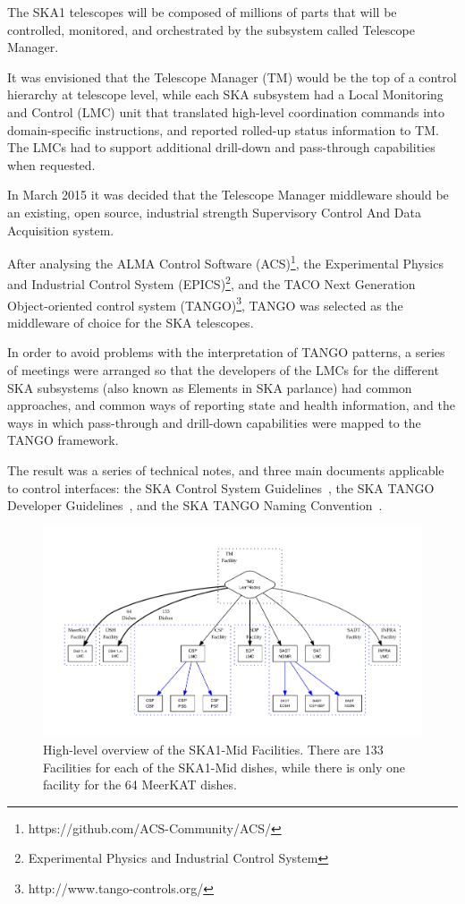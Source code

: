\documentclass[a4paper,
               biblatex,       %
               keeplastbox,    %
               ]{jacow-2_1}    %
\begin{document}
The SKA1 telescopes will be composed of millions of parts that will be controlled, monitored, and orchestrated by the subsystem called Telescope Manager. 

It was envisioned that the Telescope Manager (TM) would be the top of a control hierarchy at telescope level, while each SKA subsystem had a Local Monitoring and Control (LMC) unit that translated high-level coordination commands into domain-specific instructions, and reported rolled-up status information to TM. The LMCs had to support additional drill-down and pass-through capabilities when requested.

In March 2015 it was decided that the Telescope Manager middleware should be an existing, open source, industrial strength Supervisory Control And Data Acquisition system.

After analysing the ALMA Control Software (ACS)\footnote{https://github.com/ACS-Community/ACS/}, the Experimental Physics and Industrial Control System (EPICS)\footnote{Experimental Physics and 
Industrial Control System}, and the TACO Next Generation Object-oriented control system (TANGO)\footnote{http://www.tango-controls.org/}, TANGO was selected as the middleware of choice for the SKA telescopes.

In order to avoid problems with the interpretation of TANGO patterns, a series of meetings were arranged so that the developers of the LMCs for the different SKA subsystems (also known as Elements in SKA parlance) had common approaches, and common ways of reporting state and health information, and the ways in which pass-through and drill-down capabilities were mapped to the TANGO framework.

The result was a series of technical notes, and three main documents applicable to control interfaces: the SKA Control System Guidelines~\cite{000-000000-010_01}, the SKA TANGO Developer Guidelines~\cite{000-000000-011_01}, and the SKA TANGO Naming Convention~\cite{000-000000-012_01}.

\begin{figure}[!tb]
  \centering
    \includegraphics[width=\textwidth]{figs/ControlHierarchyMid}
  \caption{High-level overview of the SKA1-Mid Facilities. There are 133 Facilities for each of the SKA1-Mid dishes, while there is only one facility for the 64 MeerKAT dishes.}
  \label{fig:figs_ControlHierarchyMid}
\end{figure}
\end{document}

